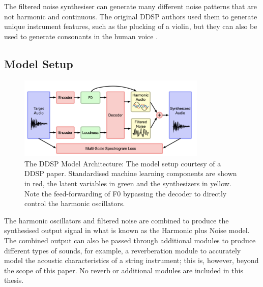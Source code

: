 \vspace{0.5cm}
\vspace{0.5cm}

The filtered noise synthesiser can generate many different noise patterns that are not harmonic and continuous. The original DDSP authors used them to generate unique instrument features, such as the plucking of a violin, but they can also be used to generate consonants in the human voice \cite{SingingDDSP}.

\subsection{Model Setup}

\begin{figure}[H]
    \centering
    \includegraphics[width=0.8\textwidth]{literature_review/DDSPArchitecture.png}
    \caption{The DDSP Model Architecture: The model setup courtesy of a DDSP paper\cite{SingingDDSP}. Standardised machine learning components are shown in red, the latent variables in green and the synthesizers in yellow. Note the feed-forwarding of F0 bypassing the decoder to directly control the harmonic oscillators.}
    \label{fig:ddsp_model_setup}
\end{figure}

The harmonic oscillators and filtered noise are combined to produce the synthesised output signal in what is known as the Harmonic plus Noise model. The combined output can also be passed through additional modules to produce different types of sounds, for example, a reverberation module to accurately model the acoustic characteristics of a string instrument; this is, however, beyond the scope of this paper. No reverb or additional modules are included in this thesis.

